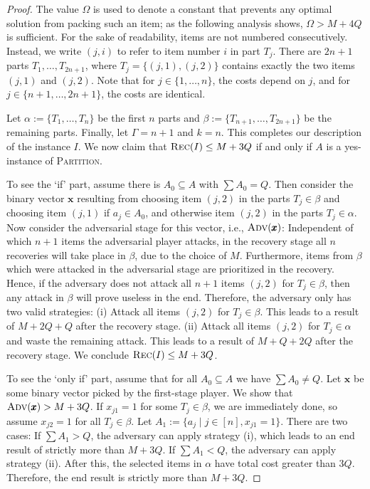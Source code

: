 \documentclass[a4paper,11pt,abstracton]{scrartcl}
\theoremstyle{definition}
\theoremstyle{remark}
\newcommand{\bigM}{\Omega}
\begin{document}
\begin{proof}
The value $\bigM$ is used to denote a constant that prevents any optimal solution from packing such an item; as the following analysis shows, $\bigM > M+4Q$ is sufficient.
For the sake of readability, items are not numbered consecutively. Instead, we write $(j,i)$ to refer to item number $i$ in part $T_j$.
There are $2n + 1$ parts $T_1, \ldots, T_{2n+1}$, where $T_j = \{(j,1), (j,2)\}$ contains exactly the two items $(j,1)$ and $(j,2)$.  
Note that for $j \in \{1, \ldots, n\}$, the costs depend on $j$, and for $j \in \{n+1, \dots, 2n+1\}$, the costs are identical.

Let $\alpha := \{T_1, \ldots, T_{n}\}$ be the first $n$ parts and $\beta := \{T_{n+1}, \ldots, T_{2n+1}\}$ be the remaining parts. Finally, let $\Gamma = n+1$ and $k = n$. This completes our description of the instance $I$. We now claim that $\textsc{Rec}(I) \leq M + 3Q$ if and only if $A$ is a yes-instance of \textsc{Partition}.

To see the `if' part, assume there is $A_0 \subseteq A$ with $\sum A_0 = Q$. Then consider the binary vector $\pmb x$ resulting from choosing item $(j,2)$ in the parts $T_j \in \beta$ and choosing item $(j,1)$ if $a_j \in A_0$, and otherwise item $(j, 2)$ in the parts $T_j \in \alpha$. Now consider the adversarial stage for this vector, i.e., $\textsc{Adv}(\pmb x)$: Independent of which $n+1$ items the adversarial player attacks, in the recovery stage all $n$ recoveries will take place in $\beta$, due to the choice of $M$. Furthermore, items from $\beta$ which were attacked in the adversarial stage are prioritized in the recovery. Hence, if the adversary does not attack all $n+1$ items $(j,2)$ for $T_j \in \beta$, then any attack in $\beta$ will prove useless in the end. Therefore, the adversary only has two valid strategies:  (i) Attack all items $(j,2)$ for $T_j \in \beta$. This leads to a result of $M + 2Q + Q$ after the recovery stage. (ii) Attack all items $(j,2)$ for $T_j \in \alpha$ and waste the remaining attack. This leads to a result of $M + Q + 2Q$ after the recovery stage. We conclude $\textsc{Rec}(I) \leq M + 3Q$.

To see the `only if' part, assume that for all $A_0 \subseteq A$ we have $\sum A_0 \neq Q$. Let $\pmb x$ be some binary vector picked by the first-stage player. We show that $\textsc{Adv}(\pmb x) > M + 3Q$. If $x_{j1} = 1$ for some $T_j \in \beta$, we are immediately done, so assume $x_{j2} = 1$ for all $T_j \in \beta$. Let $A_1 := \{a_j \mid j \in [n], x_{j1} = 1\}$. There are two cases: If $\sum A_1 > Q$, the adversary can apply strategy (i), which  leads to an end result of strictly more than $M + 3Q$. If $\sum A_1 < Q$, the adversary can apply strategy (ii). After this, the selected items in $\alpha$ have total cost greater than $3Q$. Therefore, the end result is strictly more than $M + 3Q$.

\end{proof}
\end{document}
